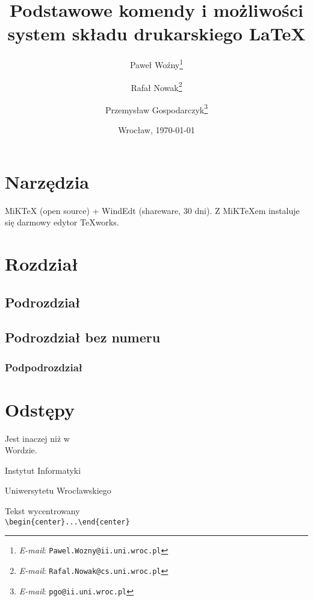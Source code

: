 \documentclass[11pt,wide]{mwart}
\date{Wrocław, \today}
\title{\LARGE\textbf{Podstawowe komendy i możliwości}\\system składu drukarskiego \LaTeX}
\author{Paweł Woźny\thanks{\textit{E-mail}: \texttt{Pawel.Wozny@ii.uni.wroc.pl}}%
	    \and
		Rafał Nowak\thanks{\textit{E-mail}: \texttt{Rafal.Nowak@cs.uni.wroc.pl}}
        \and
        Przemysław Gospodarczyk\thanks{\textit{E-mail}: \texttt{pgo@ii.uni.wroc.pl}}}
\begin{document}
\maketitle                %
\thispagestyle{empty}     %
\tableofcontents          %

\section{Narzędzia}

\noindent MiKTeX (open source) + WindEdt (shareware, 30 dni). Z MiKTeXem instaluje się darmowy edytor TeXworks.

\section{Rozdział}

\subsection{Podrozdział}
\subsection*{Podrozdział bez numeru}

\subsubsection{Podpodrozdział}


\section{Odstępy}
Jest          inaczej niż w\\
Wordzie.\newline\newline


\noindent Instytut\hspace{4.75cm} Informatyki

\vspace{1cm}






\hspace{1cm} Uniwersytetu Wrocławskiego



\begin{center}
Tekst wycentrowany\\
\verb+\begin{center}...\end{center}+
\end{center}
\end{document}
